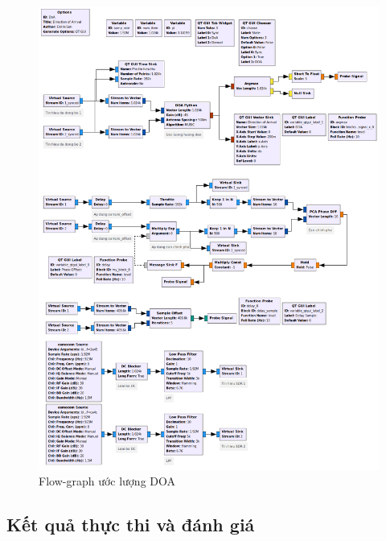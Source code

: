 {\begin{figure} [!ht]
	\includegraphics[width=\textwidth,height=\textheight,keepaspectratio]{figures/DoA_FM_grc.png}
	\caption{Flow-graph ước lượng DOA}
	\label{fig:DoA_FM}
\end{figure}
\newpage
\subsection{Kết quả thực thi và đánh giá}

}
